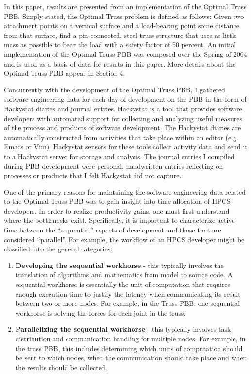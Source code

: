 \documentclass[11pt,twocolumn]{article}
\begin{document}
In this paper, results are presented from an implementation of the
Optimal Truss PBB.  Simply stated, the Optimal Truss problem is
defined as follows:  Given two attachment points on a vertical surface
and a load-bearing point some distance from that surface, find a
pin-connected, steel truss structure that uses as little mass as
possible to bear the load with a safety factor of 50 percent.  An initial
implementation of the Optimal Truss PBB was composed over the Spring of
2004 and is used as a basis of data for results in this paper.  More
details about the Optimal Truss PBB appear in Section 4.

Concurrently with the development of the Optimal Truss PBB, I gathered
software engineering data for each day of development on the PBB in
the form of Hackystat\cite{HackySite} diaries and journal entries.
Hackystat is a tool that provides software developers with automated
support for collecting and analyzing useful measures of the process
and products of software development.  The Hackystat diaries are
automatically constructed from activities that take place within an
editor (e.g. Emacs or Vim).  Hackystat sensors for these tools collect
activity data and send it to a Hackystat server for storage and
analysis.  The journal entries I compiled during PBB development were
personal, handwritten entries reflecting on processes or products that
I felt Hackystat did not capture.

One of the primary reasons for maintaining the software engineering
data related to the Optimal Truss PBB was to gain insight into time
allocation of HPCS developers.  In order to realize productivity
gains, one must first understand where the bottlenecks exist.
Specifically, it is important to characterize active time between the
``sequential'' aspects of development and those that are considered
``parallel''.  For example, the workflow of an HPCS developer might be
classified into the general categories:

\begin{enumerate}
  \item {\bf Developing the sequential workhorse} - this typically
  involves the translation of algorithms and mathematics from model to
  source code.  A sequential workhorse is essentially the unit of
  computation that requires enough execution time to justify the
  latency when communicating its result between two or more nodes.
  For example, in the Truss PBB, one sequential workhorse is solving
  the forces for each joint in the truss.
\item {\bf Parallelizing the sequential
  workhorse} - this typically involves task distribution and
  communication handling for multiple nodes.  For example, in the
  truss PBB, this includes determining which units of computation
  should be sent to which nodes, when the communication should take
  place and when the results should be collected.
\end{enumerate}
\end{document}
